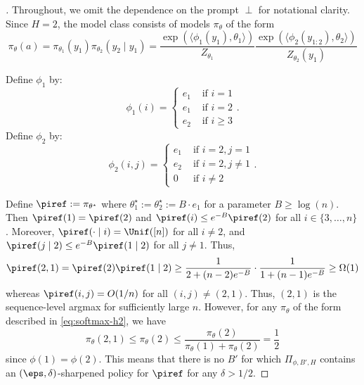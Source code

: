 \begin{proof}[]
Throughout, we omit the dependence on the prompt $\perp$ for notational clarity. Since $H=2$, the model class consists of models $\pi_\theta$ of the form
\begin{equation} 
\pi_\theta(a) = \pi_{\theta_1}(y_1) \pi_{\theta_2}(y_2\mid{} y_1) = \frac{\exp(\langle \phi_1(y_1),\theta_1\rangle)}{Z_{\theta_1}} \frac{\exp(\langle \phi_2(y_{1:2}), \theta_2\rangle)}{Z_{\theta_2}(y_1)}\label{eq:softmax-h2}
\end{equation}

Define $\phi_1$ by:
\[\phi_1(i) = \begin{cases} e_1 & \text{ if } i = 1 \\ e_1 & \text{ if } i = 2 \\ e_2 & \text{ if } i \geq 3 \end{cases}.\]
Define $\phi_2$ by:
\[\phi_2(i,j) = \begin{cases} e_1 & \text { if } i = 2, j = 1 \\ e_2 & \text { if } i = 2, j \neq 1 \\ 0 & \text { if } i \neq 2 \end{cases}.\]

Define $\piref := \pi_{\theta^\star}$ where $\theta^\star_1 := \theta^\star_2 :=B\cdot{}e_1$ for a parameter $B \geq \log(n)$. Then $\piref(1) = \piref(2)$ and $\piref(i) \leq e^{-B} \piref(2)$ for all $i \in \{3,\dots,n\}$. Moreover, $\piref(\cdot\mid{} i) = \Unif([n])$ for all $i \neq 2$, and $\piref(j\mid{} 2) \leq e^{-B} \piref(1\mid{} 2)$ for all $j \neq 1$. Thus,
\[\piref(2,1) = \piref(2) \piref(1\mid{} 2) \geq \frac{1}{2 + (n-2)e^{-B}} \cdot \frac{1}{1 + (n-1)e^{-B}} \geq \Omega(1)\]
whereas $\piref(i,j) = O(1/n)$ for all $(i,j) \neq (2,1)$. Thus, $(2,1)$ is the sequence-level argmax for sufficiently large $n$. However, for any $\pi_\theta$ of the form described in \cref{eq:softmax-h2}, we have
\[\pi_\theta(2,1) \leq \pi_\theta(2) \leq \frac{\pi_\theta(2)}{\pi_\theta(1)+\pi_\theta(2)} = \frac{1}{2}\]
since $\phi(1) = \phi(2)$. This means that there is no $B'$ for which $\Pi_{\phi,B',H}$ contains an $(\eps,\delta)$-sharpened policy for $\piref$ for any $\delta>1/2$.
\end{proof}
